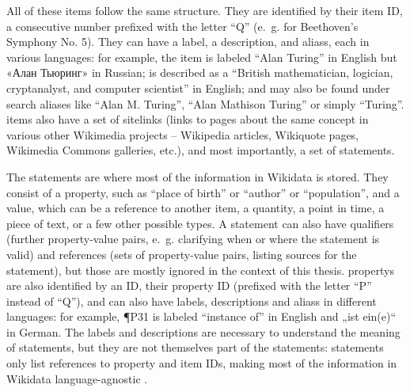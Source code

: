 All of these \glspl{item} follow the same structure.
They are identified by their \gls{item ID},
a consecutive number prefixed with the letter “Q”
(e.~g.  for Beethoven’s Symphony No. 5).
They can have a \gls{label}, a \gls{description}, and \glspl{alias}, each in various languages:
for example, the \gls{item}  is labeled “Alan Turing” in English
but «\foreignlanguage{russian}{Алан Тьюринг}» in Russian;
is described as a “British mathematician, logician, cryptanalyst, and computer scientist” in English;
and may also be found under search aliases like “Alan M. Turing”, “Alan Mathison Turing” or simply “Turing”.
\Glspl{item} also have a set of \glspl{sitelink}
(links to pages about the same concept in various other \gls{Wikimedia} projects –
\gls{Wikipedia} articles, \gls{Wikiquote} pages, \gls{Wikimedia Commons} galleries, etc.),
and most importantly, a set of \glspl{statement}.

The \glspl{statement} are where most of the information in \gls{Wikidata} is stored.
They consist of a \gls{property}, such as “place of birth” or “author” or “population”,
and a value, which can be a reference to another \gls{item}, a quantity, a point in time, a piece of text,
or a few other possible types.
A \gls{statement} can also have \glspl{qualifier}
(further property-value pairs, e.~g. clarifying when or where the statement is valid)
and \glspl{reference} (sets of property-value pairs, listing sources for the \gls{statement}),
but those are mostly ignored in the context of this thesis.
\Glspl{property} are also identified by an ID, their \gls{property ID}
(prefixed with the letter “P” instead of “Q”),
and can also have \glspl{label}, \glspl{description} and \glspl{alias} in different languages:
for example, \P{P31} is labeled “instance of” in English
and „\foreignlanguage{ngerman}{ist ein(e)}“ in German.
The \glspl{label} and \glspl{description} are necessary to understand the meaning of \glspl{statement},
but they are not themselves part of the \glspl{statement}:
\glspl{statement} only list references to \gls{property} and \glspl{item ID},
making most of the information in \gls{Wikidata} language-agnostic \cite{Kaffee:2017:GBA:3125433.3125465}.

